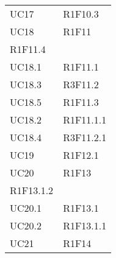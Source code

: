 \begin{longtable}{|C{6.5cm}|C{6.5cm}|}
	UC17 & R1F10.3 \\
	UC18 & \centering R1F11 \\ R1F11.4 \tabularnewline
	UC18.1 & R1F11.1 \\
	UC18.3 & R3F11.2 \\
	UC18.5 & R1F11.3 \\
	UC18.2 & R1F11.1.1 \\
	UC18.4 & R3F11.2.1 \\
	UC19 & R1F12.1 \\
	UC20 & \centering R1F13 \\ R1F13.1.2 \tabularnewline
	UC20.1 & R1F13.1 \\
	UC20.2 & R1F13.1.1 \\
	UC21 & R1F14 \\
\end{longtable}
